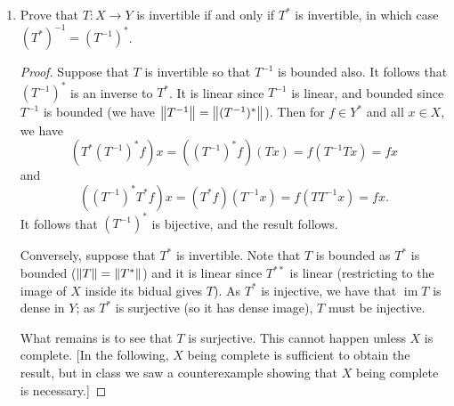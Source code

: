 \documentclass[11pt]{article}
\DeclareMathOperator{\im}{im}
\DeclareMathOperator{\dist}{dist}
\begin{document}
\begin{enumerate}
\begin{enumerate}
\begin{proof}
          Now suppose that $X$ is reflexive so that $\hat{~}\colon X\to X^{\ast\ast}$ is surjective. By identifying $X$ with $X^{\ast\ast}$ we have $T = T^{\ast\ast}|_X = T^{\ast\ast}$. Suppose that $\overline{\im T^\ast}\neq X^\ast$ so that there is $f\in X^\ast$ with nonzero distance $\dist(f,\overline{\im T^\ast}) = \varepsilon>0$ to $\overline{\im T^\ast}$. Choose via Hahn-Banach a $g\in X^{\ast\ast}$ such that $\norm{g} = 1$, $g|_{\overline{\im T^\ast}} = 0$, and $gf = \varepsilon$. With $\hat{~}$ surjective we have that $g =\widehat{x_g}$ for some nonzero (as $g$ is nonzero) $x_g\in X$. We show that $T^{\ast\ast}g = T^{\ast\ast}\widehat{x_g}$ is the zero map. For $h\in Y^\ast$, we have $(T^{\ast\ast}\widehat{x_g})h = g(T^\ast h) = 0$ since $g$ is zero on $\overline{\im T^\ast}$. Since $T^{\ast\ast}\widehat{x_g}$ is the zero map it follows that $\widehat{Tx_g}$ is the zero map; equivalently, $Tx_g = 0$ (evaluation at $Tx_g$ is zero if and only if $Tx_g$ was the zero vector since there are linear functionals which detect norms.).
        \end{proof}
        \item Prove that $T : X \to Y$ is invertible if and only if $T^\ast$ is invertible, in which case
        $(T^\ast)^{-1} = (T^{-1})^{\ast}$. \begin{proof}
          Suppose that $T$ is invertible so that $T^{-1}$ is bounded also. It follows that $(T^{-1})^\ast$ is an inverse to $T^\ast$. It is linear since $T^{-1}$ is linear, and bounded since $T^{-1}$ is bounded (we have $\norm{T^{-1}} = \norm{(T^{-1})^\ast}$). Then for $f\in Y^\ast$ and all $x\in X$, we have \[(T^\ast(T^{-1})^\ast f)x = ((T^{-1})^\ast f)(Tx) = f(T^{-1}Tx) = fx\] and \[((T^{-1})^\ast T^\ast f)x = (T^\ast f)(T^{-1}x) = f(TT^{-1}x) = fx.\] It follows that $(T^{-1})^\ast$ is bijective, and the result follows. 

          Conversely, suppose that $T^\ast$ is invertible. Note that $T$ is bounded as $T^\ast$ is bounded ($\norm{T} = \norm{T^\ast}$) and it is linear since $T^{\ast\ast}$ is linear (restricting to the image of $X$ inside its bidual gives $T$).
          As $T^\ast$ is injective, we have that $\im T$ is dense in $Y$; as $T^\ast$ is surjective (so it has dense image), $T$ must be injective.

          What remains is to see that $T$ is surjective. This cannot happen unless $X$ is complete. [In the following, $X$ being complete is sufficient to obtain the result, but in class we saw a counterexample showing that $X$ being complete is necessary.]


\end{proof}
\end{enumerate}
\end{enumerate}
\end{document}
